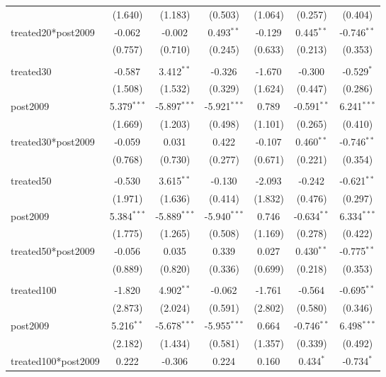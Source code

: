 \documentclass[12pt]{article}
\begin{document}
\begin{table}[!htbp]
\begin{tabular}{@{\extracolsep{5pt}}lcccccc}
  & (1.640) & (1.183) & (0.503) & (1.064) & (0.257) & (0.404) \\
 treated20*post2009 & -0.062$^{}$ & -0.002$^{}$ & 0.493$^{**}$ & -0.129$^{}$ & 0.445$^{**}$ & -0.746$^{**}$ \\
  & (0.757) & (0.710) & (0.245) & (0.633) & (0.213) & (0.353) \\
\hline \\[-1.8ex]
 treated30 & -0.587$^{}$ & 3.412$^{**}$ & -0.326$^{}$ & -1.670$^{}$ & -0.300$^{}$ & -0.529$^{*}$ \\
  & (1.508) & (1.532) & (0.329) & (1.624) & (0.447) & (0.286) \\
 post2009 & 5.379$^{***}$ & -5.897$^{***}$ & -5.921$^{***}$ & 0.789$^{}$ & -0.591$^{**}$ & 6.241$^{***}$ \\
  & (1.669) & (1.203) & (0.498) & (1.101) & (0.265) & (0.410) \\
 treated30*post2009 & -0.059$^{}$ & 0.031$^{}$ & 0.422$^{}$ & -0.107$^{}$ & 0.460$^{**}$ & -0.746$^{**}$ \\
  & (0.768) & (0.730) & (0.277) & (0.671) & (0.221) & (0.354) \\
\hline \\[-1.8ex]
 treated50 & -0.530$^{}$ & 3.615$^{**}$ & -0.130$^{}$ & -2.093$^{}$ & -0.242$^{}$ & -0.621$^{**}$ \\
  & (1.971) & (1.636) & (0.414) & (1.832) & (0.476) & (0.297) \\
 post2009 & 5.384$^{***}$ & -5.889$^{***}$ & -5.940$^{***}$ & 0.746$^{}$ & -0.634$^{**}$ & 6.334$^{***}$ \\
  & (1.775) & (1.265) & (0.508) & (1.169) & (0.278) & (0.422) \\
 treated50*post2009 & -0.056$^{}$ & 0.035$^{}$ & 0.339$^{}$ & 0.027$^{}$ & 0.430$^{**}$ & -0.775$^{**}$ \\
  & (0.889) & (0.820) & (0.336) & (0.699) & (0.218) & (0.353) \\
\hline \\[-1.8ex]
 treated100 & -1.820$^{}$ & 4.902$^{**}$ & -0.062$^{}$ & -1.761$^{}$ & -0.564$^{}$ & -0.695$^{**}$ \\
  & (2.873) & (2.024) & (0.591) & (2.802) & (0.580) & (0.346) \\
 post2009 & 5.216$^{**}$ & -5.678$^{***}$ & -5.955$^{***}$ & 0.664$^{}$ & -0.746$^{**}$ & 6.498$^{***}$ \\
  & (2.182) & (1.434) & (0.581) & (1.357) & (0.339) & (0.492) \\
 treated100*post2009 & 0.222$^{}$ & -0.306$^{}$ & 0.224$^{}$ & 0.160$^{}$ & 0.434$^{*}$ & -0.734$^{*}$ \\

\end{tabular}
\end{table}
\end{document}
